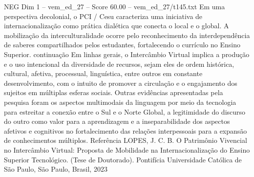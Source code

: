\begin{textsample}{NEG Dim 1 – vem\_ed\_27 – Score 60.00 – vem\_ed\_27/t145.txt}
Em uma perspectiva decolonial, o PCI / Cesu caracteriza uma iniciativa de internacionalização como prática dialética que conecta o local e o global.
A mobilização da interculturalidade ocorre pelo reconhecimento da interdependência de saberes compartilhados pelos estudantes, fortalecendo o currículo no Ensino Superior. continuação Em linhas gerais, o Intercâmbio Virtual implica a produção e o uso intencional da diversidade de recursos, sejam eles de ordem histórica, cultural, afetiva, processual, linguística, entre outros em constante desenvolvimento, com o intuito de promover a circulação e o engajamento dos sujeitos em múltiplas esferas sociais.
Outras evidências apresentadas pela pesquisa foram os aspectos multimodais da linguagem por meio da tecnologia para estreitar a conexão entre o Sul e o Norte Global, a legitimidade do discurso do outro como valor para a aprendizagem e a inseparabilidade dos aspectos afetivos e cognitivos no fortalecimento das relações interpessoais para a expansão de conhecimentos múltiplos.
Referência LOPES, J.
C.
B.
O Patrimônio Vivencial no Intercâmbio Virtual: Proposta de Mobilidade na Internacionalização do Ensino Superior Tecnológico. (Tese de Doutorado).
Pontifícia Universidade Católica de São Paulo, São Paulo, Brasil, 2023

\end{textsample}
